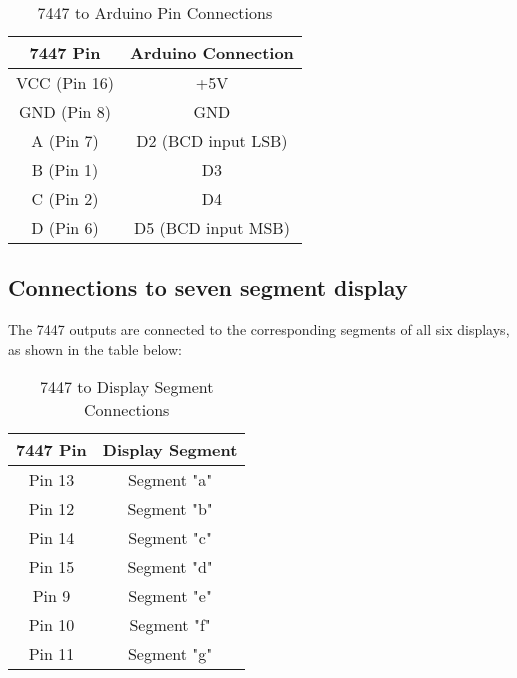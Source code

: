 \documentclass[journal]{IEEEtran}
\begin{document}
\begin{table}[H]
    \centering
    \caption{7447 to Arduino Pin Connections}
    \begin{tabular}{|c|c|}
        \hline
        \textbf{7447 Pin} & \textbf{Arduino Connection} \\
        \hline
        VCC (Pin 16) & +5V \\
        GND (Pin 8) & GND \\
        A (Pin 7) & D2 (BCD input LSB) \\
        B (Pin 1) & D3 \\
        C (Pin 2) & D4 \\
        D (Pin 6) & D5 (BCD input MSB) \\
        \hline
    \end{tabular}
\end{table}
\subsection{Connections to seven segment display}
The 7447 outputs are connected to the corresponding segments of all six displays, as shown in the table below:

\begin{table}[H]
    \centering
    \caption{7447 to Display Segment Connections}
    \begin{tabular}{|c|c|}
        \hline
        \textbf{7447 Pin} & \textbf{Display Segment} \\
        \hline
        Pin 13 & Segment "a" \\
        Pin 12 & Segment "b" \\
        Pin 14 & Segment "c" \\
        Pin 15 & Segment "d" \\
        Pin 9  & Segment "e" \\
        Pin 10 & Segment "f" \\
        Pin 11 & Segment "g" \\
        \hline
    \end{tabular}
\end{table}
\end{document}
